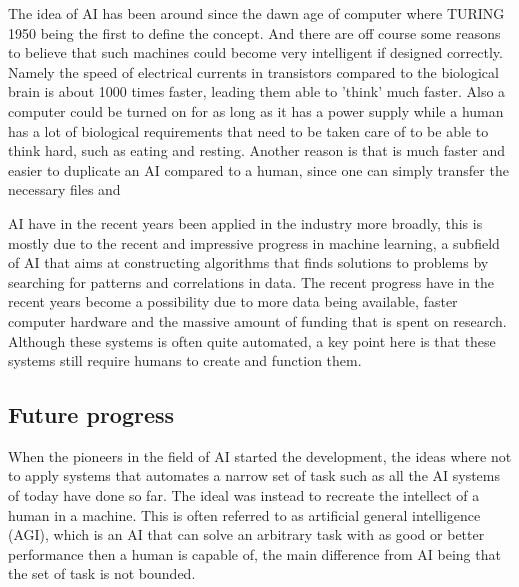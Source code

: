 \documentclass[12pt,A4]{report}
\theoremstyle{definition}
\begin{document}
The idea of AI has been around since the dawn age of computer where TURING 1950 being the first to define the concept. And there are off course some reasons to believe that such machines could become very intelligent if designed correctly. Namely the speed of electrical currents in transistors compared to the biological brain is about 1000 times faster, leading them able to 'think' much faster. Also a computer could be turned on for as long as it has a power supply while a human has a lot of biological requirements that need to be taken care of to be able to think hard, such as eating and resting. Another reason is that is much faster and easier to duplicate an AI compared to a human, since one can simply transfer the necessary files and 

AI have in the recent years been applied in the industry more broadly, this is mostly due to the recent and impressive progress in machine learning, a subfield of AI that aims at constructing algorithms that finds solutions to problems by searching for patterns and correlations in data. The recent progress have in the recent years become a possibility due to more data being available, faster computer hardware and the massive amount of funding that is spent on research. Although these systems is often quite automated, a key point here is that these systems still require humans to create and function them.


\subsection{Future progress}
When the pioneers in the field of AI started the development, the ideas where not to apply systems that automates a narrow set of task such as all the AI systems of today have done so far. The ideal was instead to recreate the intellect of a human in a machine. This is often referred to as artificial general intelligence (AGI), which is an AI that can solve an arbitrary task with as good or better performance then a human is capable of, the main difference from AI being that the set of task is not bounded.
\end{document}
